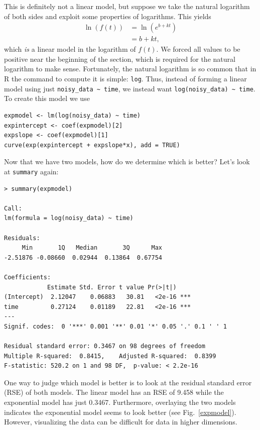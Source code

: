 \documentclass[12pt]{article}
\theoremstyle{remark}
\begin{document}
This is definitely not a linear model, but suppose we take the natural logarithm of both sides and exploit some properties of logarithms. This yields
\begin{align*}
	\ln(f(t)) &= \ln(e^{b + kt}) \\
	&= b + kt,
\end{align*}
which \emph{is} a linear model in the logarithm of $f(t)$. We forced all values to be positive near the beginning of the section, which is required for the natural logarithm to make sense. Fortunately, the natural logarithm is so common that in R the command to compute it is simple: \verb|log|. Thus, instead of forming a linear model using just \verb|noisy_data ~ time|, we instead want \verb|log(noisy_data) ~ time|. To create this model we use

\begin{Verbatim}[frame=single, fontsize=\small]
expmodel <- lm(log(noisy_data) ~ time)
expintercept <- coef(expmodel)[2]
expslope <- coef(expmodel)[1]
curve(exp(expintercept + expslope*x), add = TRUE)
\end{Verbatim}

Now that we have two models, how do we determine which is better? Let's look at \verb|summary| again:

\begin{Verbatim}[frame=single, fontsize=\small]
> summary(expmodel)

Call:
lm(formula = log(noisy_data) ~ time)

Residuals:
     Min       1Q   Median       3Q      Max 
-2.51876 -0.08660  0.02944  0.13864  0.67754 

Coefficients:
            Estimate Std. Error t value Pr(>|t|)    
(Intercept)  2.12047    0.06883   30.81   <2e-16 ***
time         0.27124    0.01189   22.81   <2e-16 ***
---
Signif. codes:  0 '***' 0.001 '**' 0.01 '*' 0.05 '.' 0.1 ' ' 1

Residual standard error: 0.3467 on 98 degrees of freedom
Multiple R-squared:  0.8415,	Adjusted R-squared:  0.8399 
F-statistic: 520.2 on 1 and 98 DF,  p-value: < 2.2e-16
\end{Verbatim}

One way to judge which model is better is to look at the residual standard error (RSE) of both models. The linear model has an RSE of 9.458 while the exponential model has just 0.3467. Furthermore, overlaying the two models indicates the exponential model seems to look better (see Fig.~\ref{expmodel}). However, visualizing the data can be difficult for data in higher dimensions.
\end{document}
